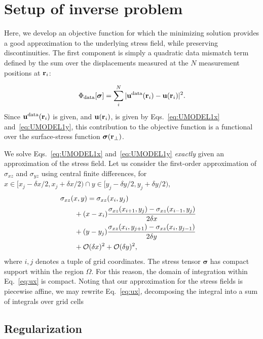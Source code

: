 \documentclass[aps,prl,reprint,twocolumn,groupedaddress,showpacs]{revtex4-1}
\def\r{{\bf r}}
\def\u{{\bf u}}
\newcommand{\bs}{\boldsymbol{\sigma}}
\begin{document}
%




\section{Setup of inverse problem}

Here, we develop an objective function for which the minimizing
solution provides a good approximation to the underlying stress
field, while preserving discontinuities.
 The first component is simply a quadratic data mismatch term
defined by the sum over the displacements measured at the $N$
measurement positions at $\r_{i}$:


\begin{equation}
\Phi_{\rm data}[\bs] = \sum_{i}^{N}\vert \u^{\rm
  data}(\r_{i})- \u(\r_i)\vert^{2}.
\end{equation}
%
Since $\u^{\rm data}(\r_{i})$ is given, and $\u(\r_{i})$, is given by
Eqs.~\ref{eq:UMODEL1x} and~\ref{eq:UMODEL1y}, this contribution to the objective function is a
functional over the surface-stress function $\bs(\r_{\perp})$. 

We solve Eqs.~\ref{eq:UMODEL1x} and~\ref{eq:UMODEL1y} \emph{exactly} given
an approximation of the stress field.
  Let us consider the first-order approximation of $\sigma_{xz}$ and $\sigma_{yz}$ using central finite differences, for $x\in[x_j - \delta x/2, x_j+\delta x/2) \cap y\in[y_j-\delta y/2, y_j + \delta y /2)$,
\begin{align}
\lefteqn{\sigma_{xz}(x,y) =\sigma_{xz}(x_i , y_j)  }\nonumber \\
& \qquad+ (x-x_i)\frac{\sigma_{xz}(x_{i+1},y_j) -\sigma_{xz}(x_{i-1},y_j) }{2\delta x}  \nonumber\\
&\qquad + (y-y_j)\frac{\sigma_{xz}(x_i,y_{j+1}) - \sigma_{xz}(x_i,y_{j-1}) }{2\delta y} \nonumber\\
&\qquad + \mathcal{O}(\delta x)^2 + \mathcal{O}(\delta y)^2,\label{eq:sigma_affine}
\end{align}
where $i,j$ denotes a tuple of grid coordinates. The stress tensor $\boldsymbol{\sigma}$ has compact support within the region $\Omega$. For this reason, the domain of integration within Eq.~\ref{eq:ux} is compact. Noting that our approximation for the stress fields is piecewise affine, we may rewrite Eq.~\ref{eq:ux}, decomposing the integral into a sum of integrals over grid cells

\subsection{Regularization}
\end{document}
